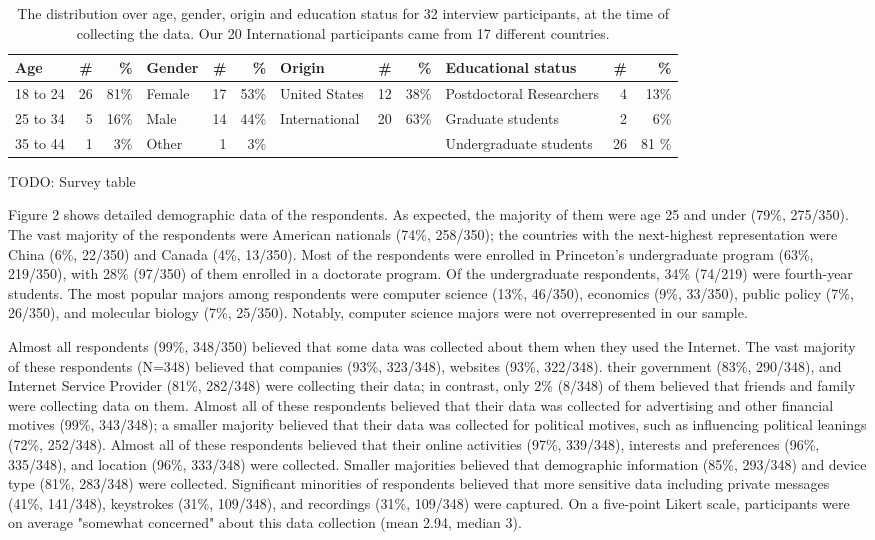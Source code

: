 \begin{table*}[h!]
\centering
\begin{tabular}{l r r |l r r|l r r|l r r} 
 \hline
 Age & \# & \% & Gender & \# & \% & Origin & \# & \% & Educational status & \# & \% \\
\hline
18 to 24 & 26 & 81\% & Female & 17 & 53\% & United States & 12 & 38\% & Postdoctoral Researchers & 4 & 13\% \\
25 to 34 & 5 & 16\% & Male & 14 & 44\% & International & 20 & 63\% & Graduate students & 2 & 6\% \\
35 to 44 & 1 & 3\% & Other & 1 & 3\% & & & & Undergraduate students & 26 & 81 \% \\
 \hline
\end{tabular}
\caption{The distribution over age, gender, origin and education status for 32 interview participants, at the time of collecting the data. Our 20 International participants came from 17 different countries.}
\label{table:1}
\end{table*}


TODO: Survey table 

Figure 2 shows detailed demographic data of the respondents. As expected, the
majority of them were age 25 and under (79\%, 275/350). The vast majority of
the respondents were American nationals (74\%, 258/350); the countries with
the next-highest representation were China (6\%, 22/350) and Canada (4\%,
13/350). Most of the respondents were enrolled in Princeton's undergraduate
program (63\%, 219/350), with 28\% (97/350) of them enrolled in a doctorate
program. Of the undergraduate respondents, 34\% (74/219) were fourth-year
students. The most popular majors among respondents were computer science
(13\%, 46/350), economics (9\%, 33/350), public policy (7\%, 26/350), and
molecular biology (7\%, 25/350). Notably, computer science majors were not
overrepresented in our sample.

Almost all respondents (99\%, 348/350) believed that some data was collected
about them when they used the Internet. The vast majority of these respondents
(N=348) believed that companies (93\%, 323/348), websites (93\%, 322/348).
their government (83\%, 290/348), and Internet Service Provider (81\%,
282/348) were collecting their data; in contrast, only 2\% (8/348) of them
believed that friends and family were collecting data on them. Almost all of
these respondents believed that their data was collected for advertising and
other financial motives (99\%, 343/348); a smaller majority believed that
their data was collected for political motives, such as influencing political
leanings (72\%, 252/348). Almost all of these respondents believed that their
online activities (97\%, 339/348), interests and preferences (96\%, 335/348),
and location (96\%, 333/348) were collected. Smaller majorities believed that
demographic information (85\%, 293/348) and device type (81\%, 283/348) were
collected. Significant minorities of respondents believed that more sensitive
data including private messages (41\%, 141/348), keystrokes (31\%, 109/348),
and recordings (31\%, 109/348) were captured. On a five-point Likert scale,
participants were on average "somewhat concerned" about this data collection
(mean 2.94, median 3).

